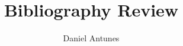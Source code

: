\documentclass[12pt]{book}
\begin{document}
	\title{Bibliography Review}
	\author{Daniel Antunes}
	\date{}
	\maketitle
	
	\tableofcontents	
				
		

	
		

				
			

	

	

\printbibliography
	
\end{document}
